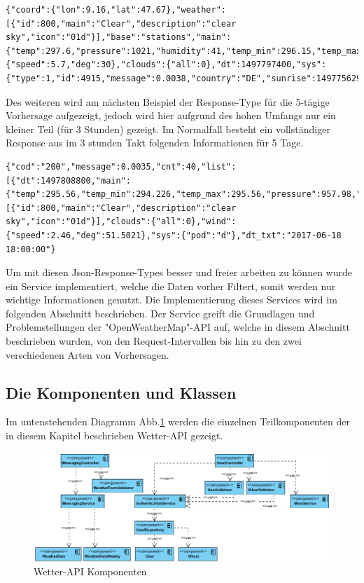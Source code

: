   \begin{lstlisting}
{"coord":{"lon":9.16,"lat":47.67},"weather":[{"id":800,"main":"Clear","description":"clear sky","icon":"01d"}],"base":"stations","main":{"temp":297.6,"pressure":1021,"humidity":41,"temp_min":296.15,"temp_max":298.15},"visibility":10000,"wind":{"speed":5.7,"deg":30},"clouds":{"all":0},"dt":1497797400,"sys":{"type":1,"id":4915,"message":0.0038,"country":"DE","sunrise":1497756293,"sunset":1497813872},"id":0,"name":"Konstanz","cod":200}
\end{lstlisting}

Des weiteren wird am nächsten Beispiel der Response-Type für die 5-tägige Vorhersage aufgezeigt, jedoch wird hier aufgrund des hohen Umfangs nur ein kleiner Teil (für 3 Stunden) gezeigt. Im Normalfall besteht ein vollständiger Response aus im 3 stunden Takt 
folgenden Informationen für 5 Tage.
 
  \begin{lstlisting}
{"cod":"200","message":0.0035,"cnt":40,"list":[{"dt":1497808800,"main":{"temp":295.56,"temp_min":294.226,"temp_max":295.56,"pressure":957.98,"sea_level":1034.02,"grnd_level":957.98,"humidity":53,"temp_kf":1.34},"weather":[{"id":800,"main":"Clear","description":"clear sky","icon":"01d"}],"clouds":{"all":0},"wind":{"speed":2.46,"deg":51.5021},"sys":{"pod":"d"},"dt_txt":"2017-06-18 18:00:00"}
\end{lstlisting}
\clearpage
Um mit diesen Json-Response-Types besser und freier arbeiten zu können wurde ein Service implementiert, welche die Daten vorher Filtert, somit werden nur wichtige Informationen genutzt. Die Implementierung dieses Services wird im folgenden Abschnitt beschrieben. Der Service greift die Grundlagen und Problemstellungen der "OpenWeatherMap"-API auf, welche in diesem Abschnitt beschrieben wurden, von den Request-Intervallen bis hin zu den zwei verschiedenen Arten von Vorhersagen.

\subsection{Die Komponenten und Klassen}

Im untenstehenden Diagramm Abb.\ref{img:KomponentenWetterAPI} werden die einzelnen Teilkomponenten der in diesem Kapitel beschrieben Wetter-API gezeigt.

\begin{figure}[!ht]
	\centering
	\includegraphics[width=1.0\textwidth]{Bilder/WetterApiKomponentendiagramm.PNG}
	\caption{Wetter-API Komponenten}
	\label{img:KomponentenWetterAPI}
\end{figure} 

